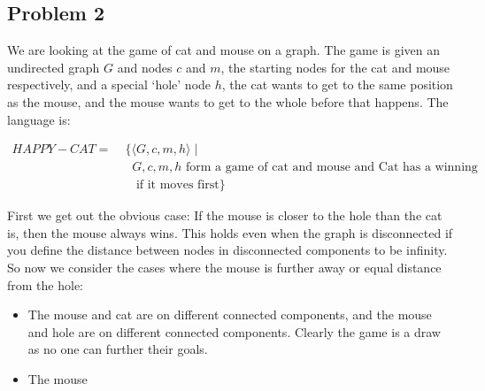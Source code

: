 \documentclass[english]{article}
\begin{document}
\subsection*{Problem 2}
We are looking at the game of cat and mouse on a graph. The game is given an undirected graph $G$ and nodes $c$ and
$m$, the starting nodes for the cat and mouse respectively, and a special `hole' node $h$, the cat wants to get to
the same position as the mouse, and the mouse wants to get to the whole before that happens. The language is:

\begin{align*}
HAPPY-CAT =&\; \{ \langle G,c,m,h \rangle \mid \\
          &\;\;\; G,c,m,h \textrm{ form a game of cat and mouse and Cat has a winning strategy} \\
          &\;\;\;    \textrm{ if it moves first} \}
\end{align*}

First we get out the obvious case: If the mouse is closer to the hole than the cat is, then the mouse always wins.
This holds even when the graph is disconnected if you define the distance between nodes in disconnected components
to be infinity. So now we consider the cases where the mouse is further away or equal distance from the hole:
\begin{itemize}
\item The mouse and cat are on different connected components, and the mouse and hole are on different connected
components. Clearly the game is a draw as no one can further their goals. 
\item The mouse
\end{itemize}


\end{document}
